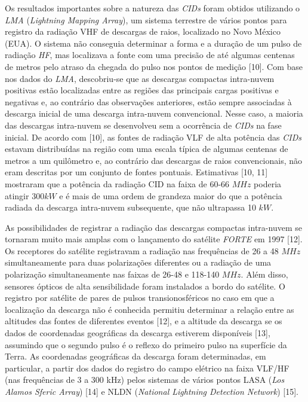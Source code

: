 \documentclass[a4paper, 12pt, onecolumn,singlespacing]{article}
\begin{document}
	Os resultados importantes sobre a natureza das \textit{CIDs} foram obtidos utilizando o \textit{LMA} (\textit{Lightning Mapping Array}), um sistema terrestre de vários pontos para registro da radiação VHF de descargas de raios, localizado no Novo México (EUA). O sistema não conseguia determinar a forma e a duração de um pulso de radiação \textit{HF}, mas localizava a fonte com uma precisão de até algumas centenas de metros pelo atraso da chegada do pulso nos pontos de medição [10]. Com base nos dados do \textit{LMA}, descobriu-se que as descargas compactas intra-nuvem positivas estão localizadas entre as regiões das principais cargas positivas e negativas e, ao contrário das observações anteriores, estão sempre associadas à descarga inicial de uma descarga intra-nuvem convencional. Nesse caso, a maioria das descargas intra-nuvem se desenvolveu sem a ocorrência de \textit{CIDs} na fase inicial. De acordo com [10], as fontes de radiação VLF de alta potência das \textit{CIDs} estavam distribuídas na região com uma escala típica de algumas centenas de metros a um quilômetro e, ao contrário das descargas de raios convencionais, não eram descritas por um conjunto de fontes pontuais. Estimativas [10, 11] mostraram que a potência da radiação CID na faixa de 60-66 $MHz$ poderia atingir $300 kW$ e é mais de uma ordem de grandeza maior do que a potência radiada da descarga intra-nuvem subsequente, que não ultrapassa 10 $kW$.
	
	As possibilidades de registrar a radiação das descargas compactas intra-nuvem se tornaram muito mais amplas com o lançamento do satélite \textit{FORTE} em 1997 [12]. Os receptores do satélite registravam a radiação nas frequências de 26 a 48 $MHz$ simultaneamente para duas polarizações diferentes ou a radiação de uma polarização simultaneamente nas faixas de 26-48 e 118-140 $MHz$. Além disso, sensores ópticos de alta sensibilidade foram instalados a bordo do satélite. O registro por satélite de pares de pulsos transionosféricos no caso em que a localização da descarga não é conhecida permitiu determinar a relação entre as altitudes das fontes de diferentes eventos [12], e a altitude da descarga se os dados de coordenadas geográficas da descarga estiverem disponíveis [13], assumindo que o segundo pulso é o reflexo do primeiro pulso na superfície da Terra. As coordenadas geográficas da descarga foram determinadas, em particular, a partir dos dados do registro do campo elétrico na faixa VLF/HF (nas frequências de 3 a 300 kHz) pelos sistemas de vários pontos LASA (\textit{Los Alamos Sferic Array}) [14] e NLDN (\textit{National Lightning Detection Network}) [15].
	
\end{document}
